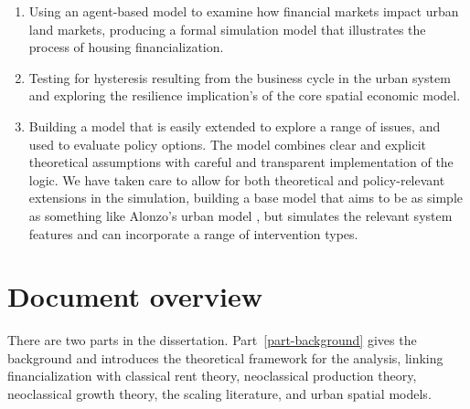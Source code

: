 \begin{enumerate}
    \item Using an agent-based model to examine how financial markets impact urban \glspl{land market},
producing a formal simulation model that illustrates the process of housing financialization. 

    \item Testing for \gls{hysteresis} resulting from the business cycle in the urban system and exploring the \gls{resilience} implication's of the core spatial economic model.

    \item Building a model that is easily extended to explore a range of issues, and used to evaluate policy options. 
The model combines clear and explicit theoretical assumptions with careful and transparent implementation of the logic. %
We have taken care to allow for both theoretical and policy-relevant extensions in the simulation,  building a base model that aims to be as simple as something like Alonzo's urban model \cite{alonsoLocationLandUse1964}, but 
simulates the relevant system features and can incorporate a range of intervention types. %
\end{enumerate}

\section{Document overview}

There are two parts in the dissertation. 
Part~\ref{part-background} gives the background and introduces the theoretical framework for the analysis, linking financialization with classical rent theory, neoclassical production theory, neoclassical growth theory, the scaling literature, and urban spatial models. 

